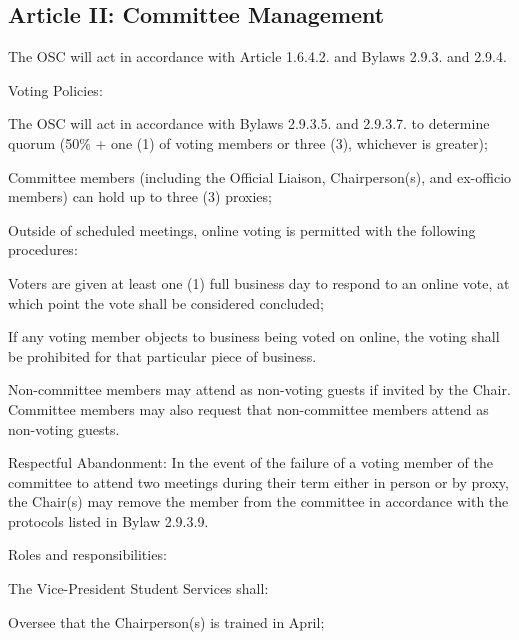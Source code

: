 \subsection{Article II: Committee Management}
\begin{longenum}[ label*=\thesubsection.\arabic*., align=left] 
	\item The OSC will act in accordance with Article 1.6.4.2. and Bylaws 2.9.3. and 2.9.4.
	\item Voting Policies:	
		\begin{longenum}[label*=\arabic*., align=left]
		\item The OSC will act in accordance with Bylaws 2.9.3.5. and 2.9.3.7. to determine quorum (50\% + one (1) of voting members or three (3), whichever is greater); 
		\item Committee members (including the Official Liaison, Chairperson(s), and ex-officio members) can hold up to three (3) proxies;
		\item Outside of scheduled meetings, online voting is permitted with the following procedures:	
			\begin{longenum}[label*=\arabic*., align=left]			
			\item Voters are given at least one (1) full business day to respond to an online vote, at which point the vote shall be considered concluded;
			\item If any voting member objects to business being voted on online, the voting shall be prohibited for that particular piece of business.
			\end{longenum}
		\end{longenum}
	\item Non-committee members may attend as non-voting guests if invited by the Chair. Committee members may also request that non-committee members attend as non-voting guests.
	\item Respectful Abandonment: In the event of the failure of a voting member of the committee to attend two meetings during their term either in person or by proxy, the Chair(s) may remove the member from the committee in accordance with the protocols listed in Bylaw 2.9.3.9.
	\item Roles and responsibilities:
		\begin{longenum}[label*=\arabic*., align=left]
		\item The Vice-President Student Services shall:
			\begin{longenum}[label*=\arabic*., align=left]
			\item Oversee that the Chairperson(s) is trained in April;

\end{longenum}
\end{longenum}
\end{longenum}
